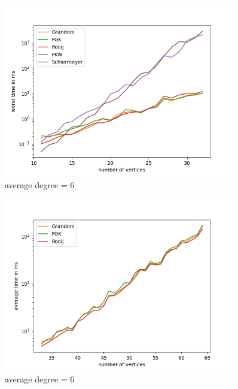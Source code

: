 \begin{figure}[H]
    \centering
    \includegraphics[width=0.9\textwidth]{figures/m6_worst.png}
    \caption{average degree = 6}
    \label{fig:m6_worst}
\end{figure}

\begin{figure}[H]
    \centering
    \includegraphics[width=0.9\textwidth]{figures/l6_average.png}
    \caption{average degree = 6}
    \label{fig:l6_average}
\end{figure}

